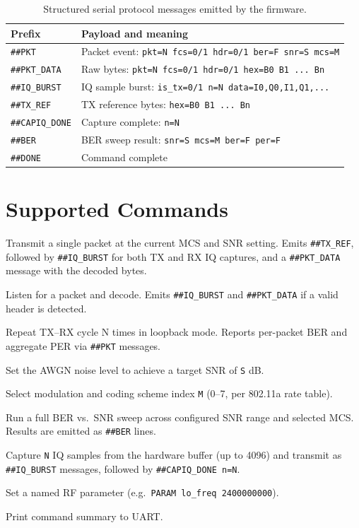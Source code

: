 \documentclass[12pt, a4paper, oneside]{report}
\begin{document}
\begin{table}[H]
  \centering
  \caption{Structured serial protocol messages emitted by the firmware.}
  \label{tab:serial_protocol}
  \begin{tabular}{lp{9cm}}
    \toprule
    \textbf{Prefix} & \textbf{Payload and meaning} \\
    \midrule
    \texttt{\#\#PKT}        & Packet event: \texttt{pkt=N fcs=0/1 hdr=0/1 ber=F snr=S mcs=M} \\
    \texttt{\#\#PKT\_DATA}  & Raw bytes: \texttt{pkt=N fcs=0/1 hdr=0/1 hex=B0 B1 ... Bn} \\
    \texttt{\#\#IQ\_BURST}  & IQ sample burst: \texttt{is\_tx=0/1 n=N data=I0,Q0,I1,Q1,...} \\
    \texttt{\#\#TX\_REF}    & TX reference bytes: \texttt{hex=B0 B1 ... Bn} \\
    \texttt{\#\#CAPIQ\_DONE}& Capture complete: \texttt{n=N} \\
    \texttt{\#\#BER}        & BER sweep result: \texttt{snr=S mcs=M ber=F per=F} \\
    \texttt{\#\#DONE}       & Command complete \\
    \bottomrule
  \end{tabular}
\end{table}

\section{Supported Commands}

\begin{description}[style=nextline, leftmargin=2cm]
  \item[\texttt{TX}] Transmit a single packet at the current MCS and SNR setting. Emits \texttt{\#\#TX\_REF}, followed by \texttt{\#\#IQ\_BURST} for both TX and RX IQ captures, and a \texttt{\#\#PKT\_DATA} message with the decoded bytes.
  \item[\texttt{RX}] Listen for a packet and decode. Emits \texttt{\#\#IQ\_BURST} and \texttt{\#\#PKT\_DATA} if a valid header is detected.
  \item[\texttt{LOOP N}] Repeat TX–RX cycle N times in loopback mode. Reports per-packet BER and aggregate PER via \texttt{\#\#PKT} messages.
  \item[\texttt{SNR S}] Set the AWGN noise level to achieve a target SNR of \texttt{S} dB.
  \item[\texttt{MCS M}] Select modulation and coding scheme index \texttt{M} (0–7, per 802.11a rate table).
  \item[\texttt{SWEEP}] Run a full BER vs.\ SNR sweep across configured SNR range and selected MCS. Results are emitted as \texttt{\#\#BER} lines.
  \item[\texttt{CAPIQ N}] Capture \texttt{N} IQ samples from the hardware buffer (up to 4096) and transmit as \texttt{\#\#IQ\_BURST} messages, followed by \texttt{\#\#CAPIQ\_DONE n=N}.
  \item[\texttt{PARAM name value}] Set a named RF parameter (e.g.\ \texttt{PARAM lo\_freq 2400000000}).
  \item[\texttt{HELP}] Print command summary to UART.
\end{description}
\end{document}
